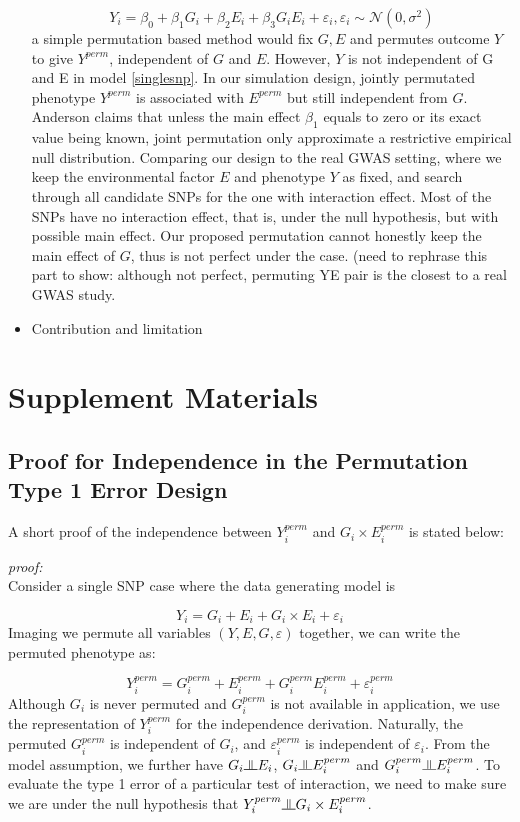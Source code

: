 \documentclass{article}
\newcommand{\indep}{\raisebox{0.05em}{\rotatebox[origin=c]{90}{$\models$}}}
\begin{document}
\begin{itemize}
	\begin{equation}
	Y_i=\beta_0+\beta_1G_i+\beta_2E_i+\beta_3G_iE_i+\varepsilon_i, \varepsilon_i\sim \mathcal{N}(0,\sigma^2)
	\end{equation}
	 a simple permutation based method would fix $G, E$ and permutes outcome $Y$ to give $Y^{perm}$, independent of $G$ and $E$. However, $Y$ is not independent of G and E in model \ref{singlesnp}. In our simulation design, jointly permutated phenotype $Y^{perm}$ is associated with $E^{perm}$ but still independent from $G$. Anderson claims that unless the main effect $\beta_{1}$ equals to zero or its exact value being known, joint permutation only approximate a restrictive empirical null distribution. Comparing our design to the real GWAS setting, where we keep the environmental factor $E$ and phenotype $Y$ as fixed, and search through all candidate SNPs for the one with interaction effect. Most of the SNPs have no interaction effect, that is, under the null hypothesis, but with possible main effect. Our proposed permutation cannot honestly keep the main effect of $G$, thus is not perfect under the case. (need to rephrase this part to show: although not perfect, permuting YE pair is the closest to a real GWAS study.
	\item Contribution and limitation
	
\end{itemize}


\printbibliography

\newpage
\section{Supplement Materials}
\subsection{Proof for Independence in  the Permutation Type 1 Error Design}
A short proof of the independence between $Y^{perm}_i$ and $G_i\times E_i^{perm}$ is stated below:

\noindent \textit{proof:}\\
Consider a single SNP case where the data generating model is 

\begin{equation}
Y_i = G_i+E_i+G_i\times E_i+\varepsilon_i
\label{singlesnp}
\end{equation}
Imaging we permute all variables $(Y,E,G,\varepsilon)$ together, we can write the permuted phenotype as:

$$Y_i^{perm} = G_i^{perm} + E_i^{perm} +G_i^{perm}E_i^{perm}+\varepsilon_i^{perm}$$ 
Although $G_i$ is never permuted and $G_i^{perm}$ is not available in application, we use the representation of $Y^{perm}_i$ for the independence derivation. Naturally, the permuted $G_i^{perm}$ is independent of $G_i$, and $\varepsilon_i^{perm}$ is independent of $\varepsilon_i$. From the model assumption, we further have $G_i\indep E_i$, $G_i\indep E_i^{perm}$ and $G_i^{perm}\indep E_i^{perm}$. To evaluate the type 1 error of a particular test of interaction, we need to make sure we are under the null hypothesis that $Y_i^{perm}\indep G_i\times E_i^{perm}$.
\end{document}
